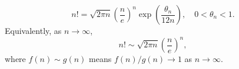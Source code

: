 $$n! = \sqrt{2\pi n} \left(\frac{n}{e}\right)^n \exp\left(\frac{\theta_n}{12n}\right), \quad 0 < \theta_n < 1.$$
Equivalently, as $n \to \infty$,
$$n! \sim \sqrt{2\pi n} \left(\frac{n}{e}\right)^n,$$
where $f(n) \sim g(n)$ means $f(n)/g(n) \to 1$ as $n \to \infty$.
